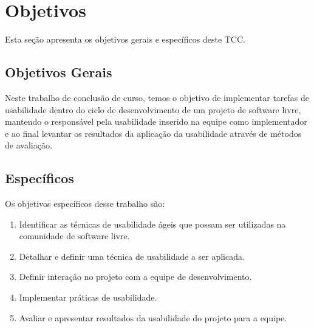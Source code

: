 
\section{Objetivos}

Esta seção apresenta os objetivos gerais e específicos deste TCC.

\subsection{Objetivos Gerais}
Neste trabalho de conclusão de curso, temos o objetivo de implementar tarefas de usabilidade dentro do ciclo de desenvolvimento de um projeto de software livre, mantendo o responsável pela usabilidade inserido na equipe como implementador e ao final levantar os resultados da aplicação da usabilidade através de métodos de avaliação.


\subsection{Específicos}
Os objetivos específicos desse trabalho são:

\begin{enumerate}
\item Identificar as técnicas de usabilidade ágeis que possam ser utilizadas na comunidade de software livre.
\item Detalhar e definir uma técnica de usabilidade a ser aplicada.
\item Definir interação no projeto com a equipe de desenvolvimento.
\item Implementar práticas de usabilidade. 	
\item Avaliar e apresentar resultados da usabilidade do projeto para a equipe.
\end{enumerate}


